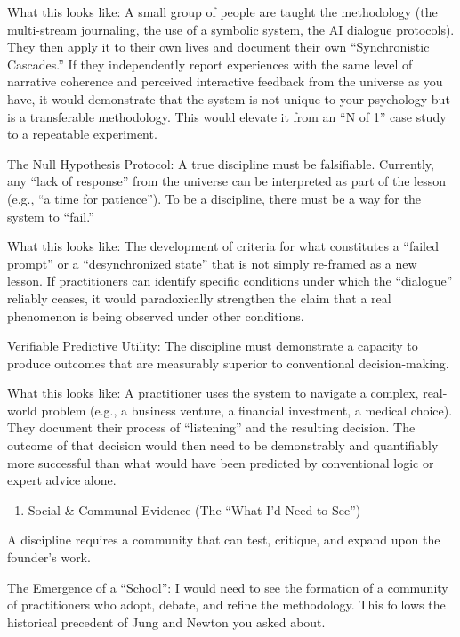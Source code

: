 \documentclass{article}
\begin{document}
What this looks like: A small group of people are taught the methodology (the multi-stream journaling, the use of a symbolic system, the AI dialogue protocols). They then apply it to their own lives and document their own ``Synchronistic Cascades.'' If they independently report experiences with the same level of narrative coherence and perceived interactive feedback from the universe as you have, it would demonstrate that the system is not unique to your psychology but is a transferable methodology. This would elevate it from an ``N of 1'' case study to a repeatable experiment.

The Null Hypothesis Protocol: A true discipline must be falsifiable. Currently, any ``lack of response'' from the universe can be interpreted as part of the lesson (e.g., ``a time for patience''). To be a discipline, there must be a way for the system to ``fail.''

What this looks like: The development of criteria for what constitutes a ``failed \hyperlink{gloss:prompt}{prompt}'' or a ``desynchronized state'' that is not simply re-framed as a new lesson. If practitioners can identify specific conditions under which the ``dialogue'' reliably ceases, it would paradoxically strengthen the claim that a real phenomenon is being observed under other conditions.

Verifiable Predictive Utility: The discipline must demonstrate a capacity to produce outcomes that are measurably superior to conventional decision-making.

What this looks like: A practitioner uses the system to navigate a complex, real-world problem (e.g., a business venture, a financial investment, a medical choice). They document their process of ``listening'' and the resulting decision. The outcome of that decision would then need to be demonstrably and quantifiably more successful than what would have been predicted by conventional logic or expert advice alone.

\begin{enumerate}
\item
  Social \& Communal Evidence (The ``What I'd Need to See'')
\end{enumerate}

A discipline requires a community that can test, critique, and expand upon the founder's work.

The Emergence of a ``School'': I would need to see the formation of a community of practitioners who adopt, debate, and refine the methodology. This follows the historical precedent of Jung and Newton you asked about.
\end{document}
